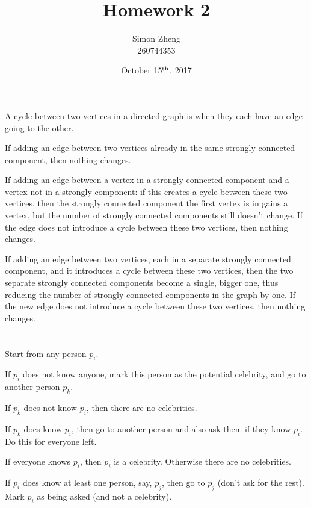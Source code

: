 \documentclass[11pt,letterpaper]{article}
\author{Simon Zheng\\260744353}
\title{Homework 2}
\date{October 15$^{\textnormal{th}}$, 2017}
\begin{document}
	\maketitle
	\thispagestyle{fancy}
	
	\section{}
	A cycle between two vertices in a directed graph is when they each have an edge going to the other.
	
	If adding an edge between two vertices already in the same strongly connected component, then nothing changes.
	
	If adding an edge between a vertex in a strongly connected component and a vertex not in a strongly component: if this creates a cycle between these two vertices, then the strongly connected component the first vertex is in gains a vertex, but the number of strongly connected components still doesn't change.
	If the edge does not introduce a cycle between these two vertices, then nothing changes.
	
	If adding an edge between two vertices, each in a separate strongly connected component, and it introduces a cycle between these two vertices, then the two separate strongly connected components become a single, bigger one, thus reducing the number of strongly connected components in the graph by one.
	If the new edge does not introduce a cycle between these two vertices, then nothing changes.
	
	\section{}
	Start from any person $p_i$.
	
	If $p_i$ does not know anyone, mark this person as the potential celebrity, and go to another person $p_k$.
	
	If $p_k$ does not know $p_i$, then there are no celebrities.
	
	If $p_k$ does know $p_i$, then go to another person and also ask them if they know $p_i$. Do this for everyone left.
	
	If everyone knows $p_i$, then $p_i$ is a celebrity.
	Otherwise there are no celebrities.\newline
	
	If $p_i$ does know at least one person, say, $p_j$, then go to $p_j$ (don't ask for the rest). Mark $p_i$ as being asked (and not a celebrity).\newline
	
\end{document}
